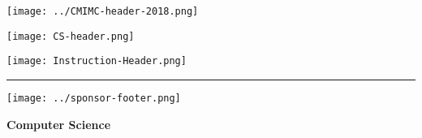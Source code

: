 \documentclass[10pt]{article}
\begin{document}
\thispagestyle{empty}
\begin{center}

\vspace*{40pt}

\texttt{[image: ../CMIMC-header-2018.png]}

\texttt{[image: CS-header.png]}

\vspace{1.4in}

\texttt{[image: Instruction-Header.png]}
\noindent\rule{15.7cm}{2pt}
\end{center}

\vspace{10pt}



\vspace{0.7in}

\begin{center}
\texttt{[image: ../sponsor-footer.png]}
\end{center}
\newpage

\begin{center}
\huge\textbf{Computer Science}\normalsize

\vspace{3pt}
\end{center}
\end{document}
